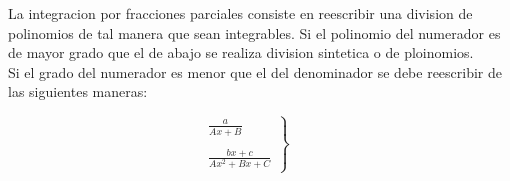 \documentclass{article}
\begin{document}
La integracion por fracciones parciales consiste en reescribir una division de polinomios de tal manera que sean integrables. Si el polinomio del numerador es de mayor grado que el de abajo se realiza division sintetica o de ploinomios.\\
 
Si el grado del numerador es menor que el del denominador se debe reescribir de las siguientes maneras:
 
\begin{equation}
\left.\begin{aligned}       
\frac{a}{Ax+B}\\\\
\frac{bx+c}{Ax^2+Bx+C}
\end{aligned}
\right\}
\qquad \text{}
\end{equation}
 
\end{document}
